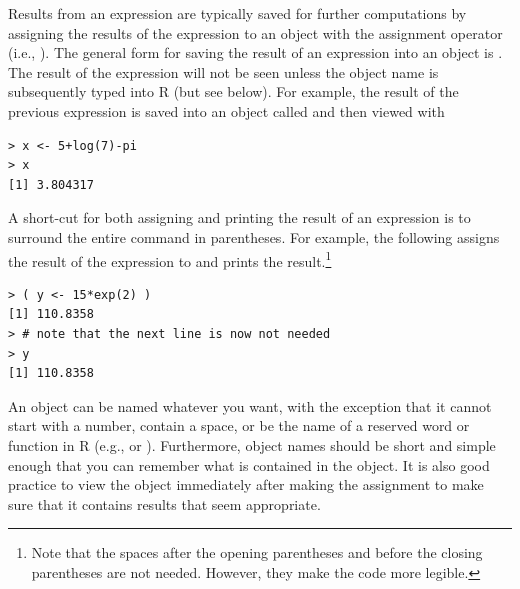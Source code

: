 \documentclass[10pt,openany]{book}\usepackage[]{graphicx}\usepackage[]{color}
\makeatletter
\newenvironment{kframe}{%
 \def\at@end@of@kframe{}%
 \ifinner\ifhmode%
  \def\at@end@of@kframe{\end{minipage}}%
  \begin{minipage}{\columnwidth}%
 \fi\fi%
 \def\FrameCommand##1{\hskip\@totalleftmargin \hskip-\fboxsep
 \colorbox{shadecolor}{##1}\hskip-\fboxsep
     \hskip-\linewidth \hskip-\@totalleftmargin \hskip\columnwidth}%
 \MakeFramed {\advance\hsize-\width
   \@totalleftmargin\z@ \linewidth\hsize
   \@setminipage}}%
 {\par\unskip\endMakeFramed%
 \at@end@of@kframe}
\newenvironment{knitrout}{}{} %
\makeatother
\begin{document}
Results from an expression are typically saved for further computations by assigning the results of the expression to an object with the assignment operator (i.e., \R{<-}).  The general form for saving the result of an expression into an object is .  The result of the expression will not be seen unless the object name is subsequently typed into R (but see below).  For example, the result of the previous expression is saved into an object called  and then viewed with
\begin{knitrout}
\color{fgcolor}\begin{kframe}
\begin{verbatim}
> x <- 5+log(7)-pi
> x
[1] 3.804317
\end{verbatim}
\end{kframe}
\end{knitrout}
A short-cut for both assigning and printing the result of an expression is to surround the entire command in parentheses.  For example, the following assigns the result of the expression to  and prints the result.\footnote{Note that the spaces after the opening parentheses and before the closing parentheses are not needed.  However, they make the code more legible.}
\begin{knitrout}
\color{fgcolor}\begin{kframe}
\begin{verbatim}
> ( y <- 15*exp(2) )
[1] 110.8358
> # note that the next line is now not needed
> y
[1] 110.8358
\end{verbatim}
\end{kframe}
\end{knitrout}


An object can be named whatever you want, with the exception that it cannot start with a number, contain a space, or be the name of a reserved word or function in R (e.g.,  or ).  Furthermore, object names should be short and simple enough that you can remember what is contained in the object.  It is also good practice to view the object immediately after making the assignment to make sure that it contains results that seem appropriate.

\end{document}
